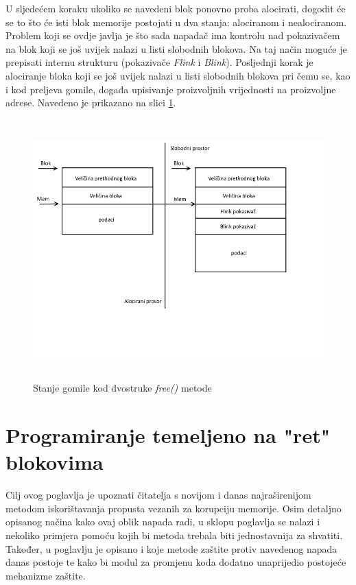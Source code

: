 \documentclass[times, utf8, diplomski, numeric]{fer}
\begin{document}
U sljedećem koraku ukoliko se navedeni blok ponovno proba
alocirati, dogodit će se to što će isti blok memorije postojati
u dva stanja: alociranom i nealociranom. Problem koji se ovdje
javlja je što sada napadač ima kontrolu nad pokazivačem na blok
koji se još uvijek nalazi u listi slobodnih blokova. Na taj način
moguće je prepisati internu strukturu (pokazivače \emph{Flink} i
\emph{Blink}). Posljednji korak je alociranje bloka koji se još
uvijek nalazi u listi slobodnih blokova pri čemu se, kao i kod
preljeva gomile, događa upisivanje proizvoljnih vrijednosti na
proizvoljne adrese. Navedeno je prikazano na slici 
\ref{fig:double_free}.

\begin{figure}[!ht]
\centering
\setlength\fboxsep{0pt}
\setlength\fboxrule{0.5pt}
\includegraphics[width=15cm, height=10cm]{slike/double_free}
\caption{Stanje gomile kod dvostruke \emph{free()} metode}
\label{fig:double_free} 
\end{figure}

 
\section{Programiranje temeljeno na "ret" blokovima}
\label{sct:rop}

Cilj ovog poglavlja je upoznati čitatelja s novijom i danas
najraširenijom metodom iskorištavanja propusta vezanih za
korupciju memorije. Osim detaljno opisanog načina kako ovaj oblik
napada radi, u sklopu poglavlja se nalazi i nekoliko primjera
pomoću kojih bi metoda trebala biti jednostavnija za shvatiti.
Također, u poglavlju je opisano i koje metode zaštite protiv
navedenog napada danas postoje te kako bi modul za promjenu koda
dodatno unaprijedio postojeće mehanizme zaštite.
\end{document}
